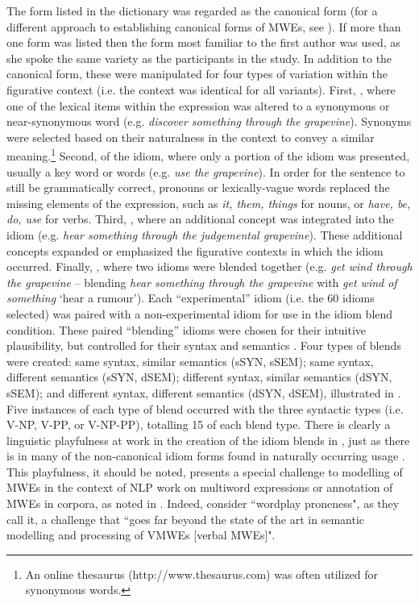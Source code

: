 \documentclass[output=paper
,modfonts
,nonflat]{langsci/langscibook}
\begin{document}
The form listed in the dictionary was regarded as the canonical form (for a different approach to establishing canonical forms of MWEs, see ). If more than one form was listed then the form most familiar to the first author was used, as she spoke the same variety as the participants in the study. In addition to the canonical form, these  were manipulated for four types of variation  within the figurative context (i.e. the context was identical for all variants). First, , where one of the lexical items within the expression was altered to a synonymous or near-synonymous word (e.g. \textit{discover something through the grapevine}). Synonyms were selected based on their naturalness in the context to convey a similar meaning.\footnote{An online thesaurus (http://www.thesaurus.com) was often utilized for synonymous words.} Second,  of the idiom, where only a portion of the idiom was presented, usually a key word or words (e.g. \textit{use the grapevine}). In order for the sentence to still be grammatically correct, pronouns or lexically-vague words replaced the missing elements of the expression, such as \textit{it, them, things} for nouns, or \textit{have, be, do, use} for verbs. Third, , where an additional concept was integrated into the idiom (e.g. \textit{hear something through the judgemental grapevine}). These additional concepts expanded or emphasized the figurative contexts in which the idiom occurred. Finally, , where two idioms were blended together (e.g. \textit{get wind through the grapevine} -- blending \textit{hear something through the grapevine} with \textit{get wind of something} `hear a rumour'). Each ``experimental'' idiom (i.e. the 60 idioms selected) was paired with a non-experimental idiom for use in the idiom blend condition. These paired ``blending'' idioms were chosen for their intuitive plausibility, but controlled for their syntax and semantics \citep{CuttingBock1997}. Four types of blends were created: same syntax, similar semantics (sSYN, sSEM); same syntax, different semantics (sSYN, dSEM); different syntax, similar semantics (dSYN, sSEM); and different syntax, different semantics (dSYN, dSEM), illustrated in . Five instances of each type of blend occurred with the three syntactic types (i.e. V-NP, V-PP, or V-NP-PP), totalling 15 of each blend type. There is clearly a linguistic playfulness at work in the creation of the idiom blends  in , just as there is in many of the non-canonical idiom forms found in naturally occurring usage \citep[cf.][]{Moon1998,Duffley2013}. This playfulness, it should be noted, presents a special challenge to modelling of MWEs in the context of NLP work on multiword expressions  or annotation of MWEs in corpora, as noted in . Indeed,  consider ``wordplay proneness", as they call it, a challenge that ``goes far beyond the state of the art in semantic modelling and processing of VMWEs [verbal MWEs]".
\end{document}
